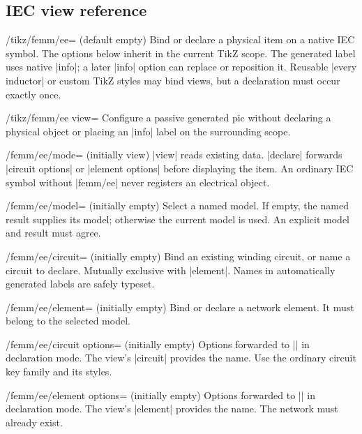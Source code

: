 \subsection{IEC view reference}
\label{sec:ee-keys}
\begin{key}{/tikz/femm/ee= (default empty)}
Bind or declare a physical item on a native IEC symbol. The options below inherit
in the current TikZ scope. The generated label uses native |info|; a later |info|
option can replace or reposition it. Reusable |every inductor| or custom TikZ
styles may bind views, but a declaration must occur exactly once.
\end{key}
\begin{key}{/tikz/femm/ee view=}
Configure a passive generated pic without declaring a physical object or placing
an |info| label on the surrounding scope.
\end{key}
\begin{key}{/femm/ee/mode= (initially view)}
|view| reads existing data. |declare| forwards |circuit options| or |element options| before displaying the item. An ordinary IEC symbol without |femm/ee|
never registers an electrical object.
\end{key}
\begin{key}{/femm/ee/model= (initially empty)}
Select a named model. If empty, the named result supplies its model; otherwise
the current model is used. An explicit model and result must agree.
\end{key}
\begin{key}{/femm/ee/circuit= (initially empty)}
Bind an existing winding circuit, or name a circuit to declare. Mutually exclusive
with |element|. Names in automatically generated labels are safely typeset.
\end{key}
\begin{key}{/femm/ee/element= (initially empty)}
Bind or declare a network element. It must belong to the selected model.
\end{key}
\begin{key}{/femm/ee/circuit options= (initially empty)}
Options forwarded to |\femmcircuit| in declaration mode. The view's |circuit|
provides the name. Use the ordinary circuit key family and its styles.
\end{key}
\begin{key}{/femm/ee/element options= (initially empty)}
Options forwarded to |\femmelement| in declaration mode. The view's |element|
provides the name. The network must already exist.
\end{key}
